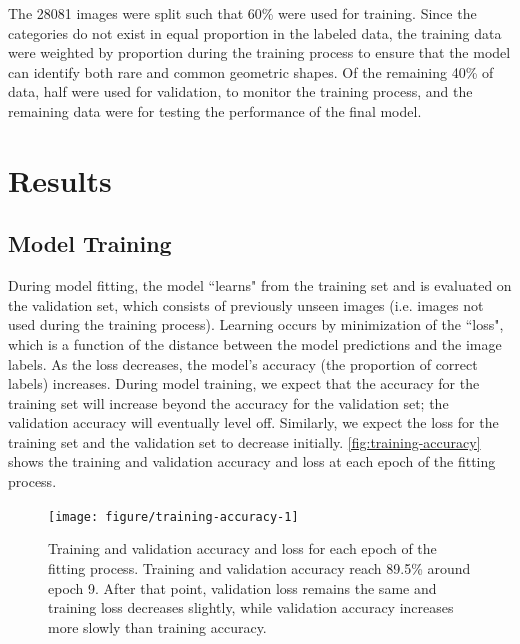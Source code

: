 \documentclass{article}\usepackage[]{graphicx}\usepackage[table]{xcolor}
\newenvironment{knitrout}{}{} %
\begin{document}
The 28081 images were split such that 60\% were used for training. Since the categories do not exist in equal proportion in the labeled data,
the training data were weighted by proportion during the training process to ensure that the model can identify both rare and common geometric shapes. Of the remaining 40\% of data, half were used for validation, to monitor the training process, and the remaining data were for testing the performance of the final model.

\section{Results}

\subsection{Model Training}
During model fitting, the model ``learns" from the training set and is evaluated on the validation set, which consists of previously unseen images (i.e. images not used during the training process). Learning occurs by minimization of the ``loss", which is a function of the distance between the model predictions and the image labels. As the loss decreases, the model's accuracy (the proportion of correct labels) increases. During model training, we expect that the accuracy for the training set will increase beyond the accuracy for the validation set; the validation accuracy will eventually level off. Similarly, we expect the loss for the training set and the validation set to decrease initially. \autoref{fig:training-accuracy} shows the training and validation accuracy and loss at each epoch of the fitting process.

\begin{knitrout}
\color{fgcolor}\begin{figure}[h]

{\centering \texttt{[image: figure/training-accuracy-1]}

}

\caption[Training and validation accuracy and loss during each epoch.]{Training and validation accuracy and loss for each epoch of the fitting process. Training and validation accuracy reach 89.5\% around epoch 9. After that point, validation loss remains the same and training loss decreases slightly, while validation accuracy increases more slowly than training accuracy.}\label{fig:training-accuracy}
\end{figure}


\end{knitrout}
\end{document}
